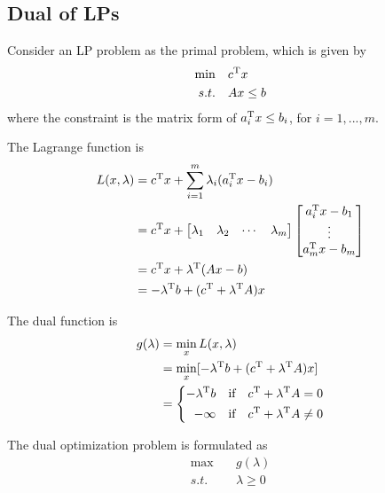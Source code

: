 




\vspace{0.5cm}
\subsection{Dual of LPs}
Consider an LP problem as the primal problem, which is given by
\begin{align*}
\min\quad &c^{{\rm T}}x\\
s.t.\quad &Ax\leq b
\end{align*}
where the constraint is the matrix form of $a_i^{{\rm T}} x\leq b_i$, for $i=1,..., m$.

The Lagrange function is 
\begin{align*}
L(x,\lambda) 
&= c^{{\rm T}}x + \sum^m_{i=1}\lambda_i (a_i^{{\rm T}}x-b_i)\\
&= c^{{\rm T}}x+
\begin{bmatrix}
\lambda_1&\lambda_2&\cdots&\lambda_m
\end{bmatrix}
\begin{bmatrix}
a_i^{{\rm T}}x-b_1\\
\vdots\\
a_m^{{\rm T}}x-b_m
\end{bmatrix} \\
&=c^{{\rm T}}x+\lambda^{{\rm T}}(Ax-b)\\
&= -\lambda^{{\rm T}}b+(c^{{\rm T}}+\lambda^{{\rm T}}A)x
\end{align*}

The dual function is
\begin{align*}
g(\lambda) 
&= \min_x L(x,\lambda) \\
&= \min_x[-\lambda^{{\rm T}}b+(c^{{\rm T}}+\lambda^{{\rm T}}A)x]\\
&=
\label{eq6}
\left\{
\begin{aligned}
-\lambda^{{\rm T}}b &\quad \text{if} & c^{{\rm T}}+\lambda^{{\rm T}}A=0 \\
-\infty &\quad \text{if} & c^{{\rm T}}+\lambda^{{\rm T}}A\neq 0
\end{aligned}
\right.
\end{align*}

The dual optimization problem is formulated as
\begin{align*}
\max\quad &g(\lambda)\\
s.t.\quad &\lambda \geq 0
\end{align*}

